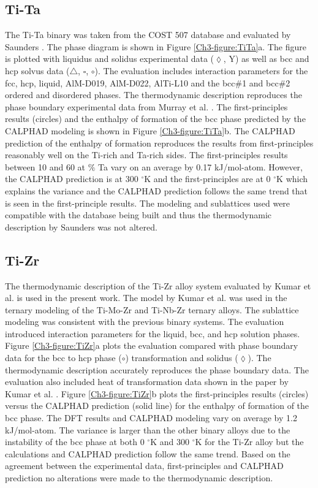 \subsection{Ti-Ta}

The Ti-Ta binary was taken from the COST 507 database and evaluated by Saunders \cite{Ansara1998}. The phase diagram is shown in Figure \ref{Ch3-figure:TiTa}a. The figure is plotted with liquidus and solidus experimental data ($\lozenge$, Y) as well as bcc and hcp solvus data ($\triangle$, $\square$, $\circ$). The evaluation includes interaction parameters for the fcc, hcp, liquid, AlM-D019, AlM-D022, AlTi-L10 and the bcc$\#$1 and bcc$\#$2 ordered and disordered phases. The thermodynamic description reproduces the phase boundary experimental data from Murray et al. \cite{Murray1987}. The first-principles results (circles) and the enthalpy of formation of the bcc phase predicted by the CALPHAD modeling is shown in Figure \ref{Ch3-figure:TiTa}b. The CALPHAD prediction of the enthalpy of formation reproduces the results from first-principles reasonably well on the Ti-rich and Ta-rich sides. The first-principles results between 10 and 60 at $\%$ Ta vary on an average by 0.17 kJ/mol-atom. However, the CALPHAD prediction is at 300 $^\circ$K and the first-principles are at 0 $^\circ$K which explains the variance and the CALPHAD prediction follows the same trend that is seen in the first-principle results. The modeling and sublattices used were compatible with the database being built and thus the thermodynamic description by Saunders was not altered. 

\subsection{Ti-Zr}

The thermodynamic description of the Ti-Zr alloy system evaluated by Kumar et al. \cite{Kumar1994a} is used in the present work. The model by Kumar et al. was used in the ternary modeling of the Ti-Mo-Zr and Ti-Nb-Zr ternary alloys. The sublattice modeling was consistent with the previous binary systems. The evaluation introduced interaction parameters for the liquid, bcc, and hcp solution phases. Figure \ref{Ch3-figure:TiZr}a plots the evaluation compared with phase boundary data for the bcc to hcp phase ($\circ$) transformation and solidus ($\lozenge$). The thermodynamic description accurately reproduces the phase boundary data. The evaluation also included heat of transformation data shown in the paper by Kumar et al. \cite{Kumar1994a}. Figure \ref{Ch3-figure:TiZr}b plots the first-principles results (circles) versus the CALPHAD prediction (solid line) for the enthalpy of formation of the bcc phase. The DFT results and CALPHAD modeling vary on average by 1.2 kJ/mol-atom. The variance is larger than the other binary alloys due to the instability of the bcc phase at both 0 $^\circ$K and 300 $^\circ$K for the Ti-Zr alloy but the calculations and CALPHAD prediction follow the same trend. Based on the agreement between the experimental data, first-principles and CALPHAD prediction no alterations were made to the thermodynamic description. 

